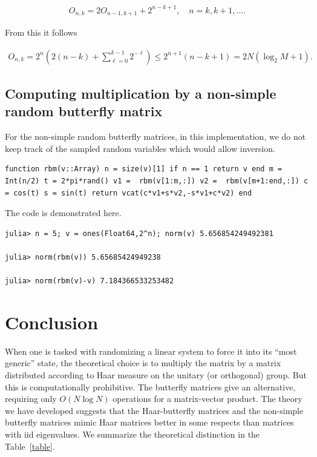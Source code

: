 \begin{align}
  O_{n,k} = 2 O_{n-1,k+1} + 2^{n-k+1}, \quad n = k, k+1, \ldots.
\end{align}

From this it follows

\begin{align}\label{e:iter}
  O_{n,k} = 2^n \left( 2(n-k) + \sum_{\ell = 0}^{k-1} 2^{-\ell} \right) \leq 2^{n+1}(n - k + 1) = 2 N (\log_2 M +1).
\end{align}

\subsection{Computing multiplication by a non-simple random butterfly matrix}\label{s:code_rbm}

For the non-simple random butterfly matrices, in this implementation, we do not keep track of the sampled random variables which would allow inversion.

\begin{lstlisting}[linewidth = \linewidth,frame = trBL] function rbm(v::Array) n = size(v)[1] if n == 1 return v end m = Int(n/2) t = 2*pi*rand() v1 =  rbm(v[1:m,:]) v2 =  rbm(v[m+1:end,:]) c = cos(t) s = sin(t) return vcat(c*v1+s*v2,-s*v1+c*v2) end
\end{lstlisting}

The code is demonstrated here.

\begin{lstlisting}[linewidth = \linewidth,frame = trBL] julia> n = 5; v = ones(Float64,2^n); norm(v) 5.656854249492381

julia> norm(rbm(v)) 5.65685424949238

julia> norm(rbm(v)-v) 7.184366533253482
\end{lstlisting}

\section{Conclusion}

When one is tasked with randomizing a linear system to force it into its ``most generic'' state, the theoretical choice is to multiply the matrix by a matrix distributed according to Haar measure on the unitary (or orthogonal) group.  But this is computationally prohibitive.  The butterfly matrices give an alternative, requiring only $O(N \log N)$ operations for a matrix-vector product.  The theory we have developed suggests that the Haar-butterfly matrices and the non-simple butterfly matrices mimic Haar matrices better in some respects than matrices with iid eigenvalues.  We summarize the theoretical distinction in the Table~\ref{table}.

